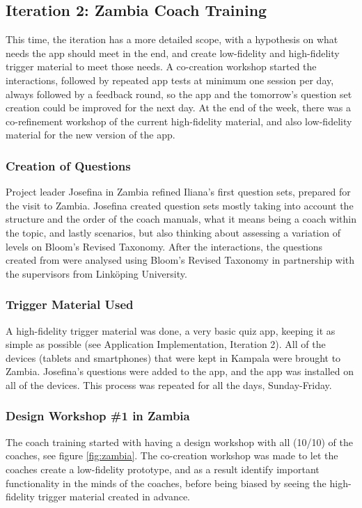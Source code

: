 \subsection{Iteration 2: Zambia Coach Training}

This time, the iteration has a more detailed scope, with a hypothesis on what needs the app should meet in the end, and create low-fidelity and high-fidelity trigger material to meet those needs. A co-creation workshop started the interactions, followed by repeated app tests at minimum one session per day, always followed by a feedback round, so the app and the tomorrow's question set creation could be improved for the next day. At the end of the week, there was a co-refinement workshop of the current high-fidelity material, and also low-fidelity material for the new version of the app.

\subsubsection*{Creation of Questions}
Project leader Josefina in Zambia refined Iliana's first question sets, prepared for the visit to Zambia. Josefina created question sets mostly taking into account the structure and the order of the coach manuals, what it means being a coach within the topic, and lastly scenarios, but also thinking about assessing a variation of levels on Bloom's Revised Taxonomy. After the interactions, the questions created from were analysed using Bloom's Revised Taxonomy in partnership with the supervisors from Linköping University.

\subsubsection{Trigger Material Used}
A high-fidelity trigger material was done, a very basic quiz app, keeping it as simple as possible (see Application Implementation, Iteration 2). All of the devices (tablets and smartphones) that were kept in Kampala were brought to Zambia. Josefina's questions were added to the app, and the app was installed on all of the devices. This process was repeated for all the days, Sunday-Friday.

\subsubsection{Design Workshop \#1 in Zambia}
The coach training started with having a design workshop with all (10/10) of the coaches, see figure \ref{fig:zambia}. The co-creation workshop was made to let the coaches create a low-fidelity prototype, and as a result identify important functionality in the minds of the coaches, before being biased by seeing the high-fidelity trigger material created in advance.

